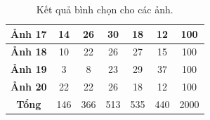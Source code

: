 \documentclass[a4paper, 12pt]{article}
\begin{document}
\begin{table}[h!]
\begin{tabular}{|c|c|c|c|c|c|c|}
\textbf{Ảnh 17}  & 14         & 26         & 30         & 18         & 12         & 100         \\ \hline
\textbf{Ảnh 18}  & 10         & 22         & 26         & 27         & 15         & 100         \\ \hline
\textbf{Ảnh 19}  & 3          & 8          & 23         & 29         & 37         & 100         \\ \hline
\textbf{Ảnh 20}  & 22         & 22         & 26         & 18         & 12         & 100         \\ \hline
\textbf{Tổng}  & 146         & 366         & 513         & 535         & 440      & 2000        \\ \hline
\end{tabular}
\caption{Kết quả bình chọn cho các ảnh.}
\label{tab:surveyresults}
\end{table}
\end{document}
